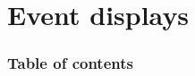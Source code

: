 \documentclass[8pt]{beamer}
\begin{document}
%      
%      
%     
%      
%      
%     
%      
 
 \section{Event displays}
 
 \begin{frame}
 \frametitle{Table of contents}
 
\end{frame}
 
\end{document}
